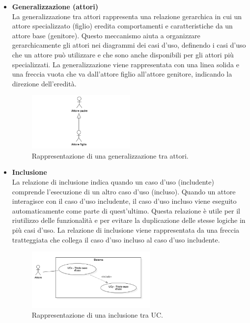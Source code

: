 \documentclass[10pt]{article}
\begin{document}
\begin{justify}
\begin{itemize}
            \item \textbf{Generalizzazione (attori)}\\
            La generalizzazione tra attori rappresenta una relazione gerarchica in cui un attore specializzato (figlio) eredita comportamenti e caratteristiche da un attore base (genitore). Questo meccanismo aiuta a organizzare gerarchicamente gli attori nei diagrammi dei casi d’uso, definendo i casi d'uso che un attore può utilizzare e che sono anche disponibili per gli attori più specializzati. La generalizzazione viene rappresentata con una linea solida e una freccia vuota che va dall'attore figlio all'attore genitore, indicando la direzione dell'eredità.
            \begin{figure}[H]
            \centering
            \includegraphics[width=0.5\textwidth]{GeneralizzazioneAttore.PNG}
            \caption{Rappresentazione di una generalizzazione tra attori.}
            \end{figure}

            \item \textbf{Inclusione}\\
            La relazione di inclusione indica quando un caso d'uso (includente) comprende l'esecuzione di un altro caso d'uso (incluso). Quando un attore interagisce con il caso d'uso includente, il caso d'uso incluso viene eseguito automaticamente come parte di quest'ultimo. Questa relazione è utile per il riutilizzo delle funzionalità e per evitare la duplicazione delle stesse logiche in più casi d'uso. La relazione di inclusione viene rappresentata da una freccia tratteggiata che collega il caso d'uso incluso al caso d'uso includente.
            \begin{figure}[H]
            \centering
            \includegraphics[width=0.6\textwidth]{InclusioneUC.PNG}
            \caption{Rappresentazione di una inclusione tra UC.}
            \end{figure}


\end{itemize}
\end{justify}
\end{document}

